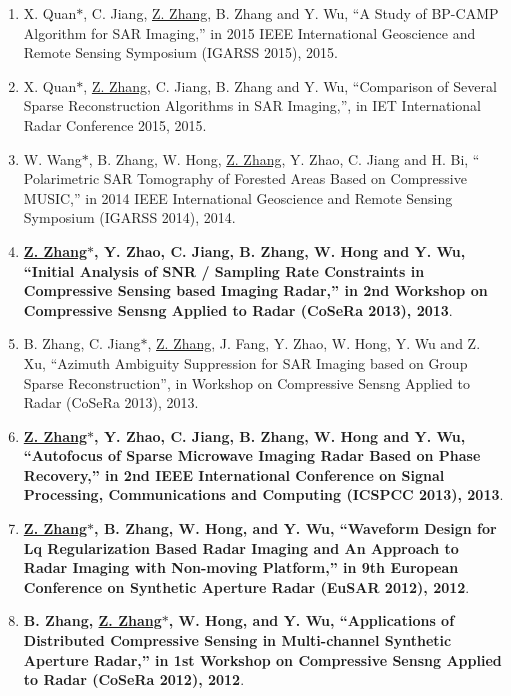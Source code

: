 \documentclass[paper=a4,fontsize=11pt]{scrartcl}
\begin{document}
\begin{enumerate}
	\item X. Quan$\ast$, C. Jiang, \underline{Z. Zhang}, B. Zhang and Y. Wu, ``A Study of BP-CAMP Algorithm for SAR Imaging,'' in 2015 IEEE International Geoscience and Remote Sensing Symposium (IGARSS 2015), 2015.
	
	\item X. Quan$\ast$, \underline{Z. Zhang}, C. Jiang, B. Zhang and Y. Wu, ``Comparison of Several Sparse Reconstruction Algorithms in SAR Imaging,'', in IET International Radar Conference 2015, 2015.
	
	\item W. Wang$\ast$, B. Zhang, W. Hong, \underline{Z. Zhang}, Y. Zhao, C. Jiang and H. Bi, `` Polarimetric SAR Tomography of Forested Areas Based on Compressive MUSIC,'' in 2014 IEEE International Geoscience and Remote Sensing Symposium (IGARSS 2014), 2014.
	
	\item \textbf{\underline{Z. Zhang$\ast$}, Y. Zhao, C. Jiang, B. Zhang, W. Hong and Y. Wu, ``Initial Analysis of SNR / Sampling Rate Constraints in Compressive Sensing based Imaging Radar,'' in 2nd Workshop on Compressive Sensng Applied to Radar (CoSeRa 2013), 2013}.
	
	\item B. Zhang, C. Jiang$\ast$, \underline{Z. Zhang}, J. Fang, Y. Zhao, W. Hong, Y. Wu and Z. Xu, ``Azimuth Ambiguity Suppression for SAR Imaging based on Group Sparse Reconstruction'', in Workshop on Compressive Sensng Applied to Radar (CoSeRa 2013), 2013.
	
	\item \textbf{\underline{Z. Zhang$\ast$}, Y. Zhao, C. Jiang, B. Zhang, W. Hong and Y. Wu, ``Autofocus of Sparse Microwave Imaging Radar Based on Phase Recovery,'' in 2nd IEEE International Conference on Signal Processing, Communications and Computing (ICSPCC 2013), 2013}.
	
	\item \textbf{\underline{Z. Zhang$\ast$}, B. Zhang, W. Hong, and Y. Wu, ``Waveform Design for Lq Regularization Based Radar Imaging and An Approach to Radar Imaging with Non-moving Platform,'' in 9th European Conference on Synthetic Aperture Radar (EuSAR 2012), 2012}.
	
	\item \textbf{B. Zhang, \underline{Z. Zhang$\ast$}, W. Hong, and Y. Wu, ``Applications of Distributed Compressive Sensing in Multi-channel Synthetic Aperture Radar,'' in 1st Workshop on Compressive Sensng Applied to Radar (CoSeRa 2012), 2012}.
	
\end{enumerate}
\end{document}

